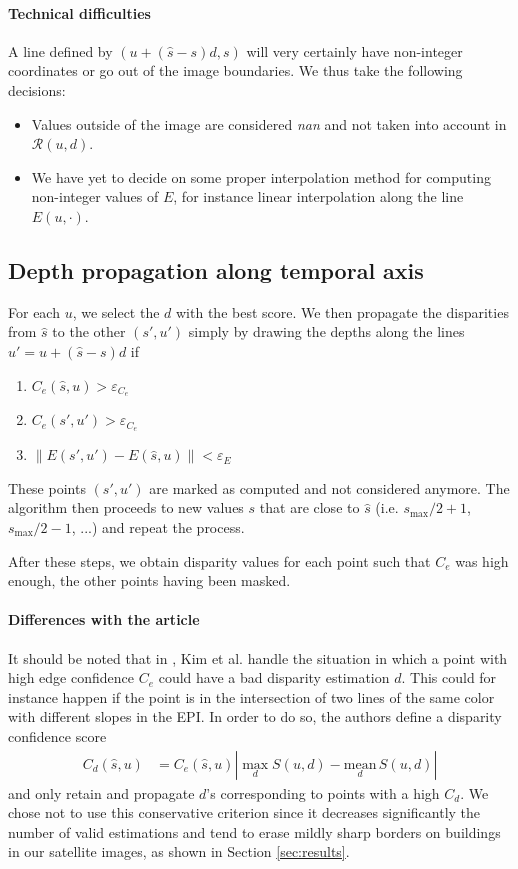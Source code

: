 \documentclass{article}
\newcommand{\norm}[1]{\left\lVert#1\right\rVert}
\theoremstyle{definition}
\begin{document}
\paragraph{Technical difficulties} A line defined by $(u + (\widehat{s} - s) d, s)$ will very certainly have non-integer coordinates or go out of the image boundaries. We thus take the following decisions:
\begin{itemize}
 \item Values outside of the image are considered \emph{nan} and not taken into account in $\mathcal{R}(u, d)$.
 \item We have yet to decide on some proper interpolation method for computing non-integer values of $E$, for instance linear interpolation along the line $E(u, \cdot)$.
\end{itemize}


\subsection{Depth propagation along temporal axis}


For each $u$, we select the $d$ with the best score. We then propagate the disparities from $\widehat{s}$ to the other $(s', u')$ simply by drawing the depths along the lines $u' = u + (\widehat{s} - s)d$ if 
\begin{enumerate}
 \item $C_e(\widehat{s}, u) > \varepsilon_{C_e}$
 \item $C_e(s', u') > \varepsilon_{C_e}$
 \item $\norm{E(s', u') - E(\widehat{s}, u)} < \varepsilon_E$
\end{enumerate}
These points $(s', u')$ are marked as computed and not considered anymore. The algorithm then proceeds to new values $s$ that are close to $\widehat{s}$ (i.e. $s_{\max} / 2 + 1$, $s_{\max} / 2 - 1$, ...) and repeat the process.


After these steps, we obtain disparity values for each point such that $C_e$ was high enough, the other points having been masked.


\paragraph{Differences with the article} It should be noted that in \cite{art:kim13:lfields}, Kim et al. handle the situation in which a point with high edge confidence $C_e$ could have a bad disparity estimation $d$. This could for instance happen if the point is in the intersection of two lines of the same color with different slopes in the EPI. In order to do so, the authors define a disparity confidence score
\begin{align}
 C_d (\widehat{s}, u) &= C_e (\widehat{s}, u) \left|\max_d S(u, d) - \underset{d}{\mathrm{mean}}\, S(u, d)\right| \label{eq:c_d}
\end{align}
and only retain and propagate $d$'s corresponding to points with a high $C_d$. We chose not to use this conservative criterion since it decreases significantly the number of valid estimations and tend to erase mildly sharp borders on buildings in our satellite images, as shown in Section \ref{sec:results}.
\end{document}
